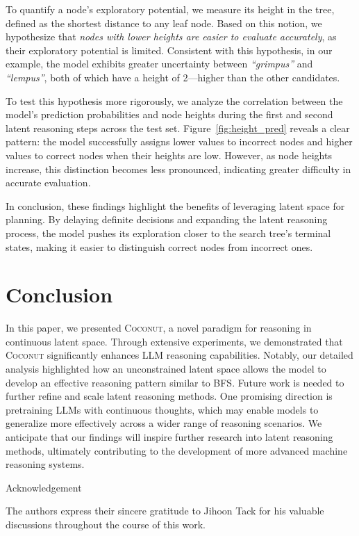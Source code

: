 \documentclass[]{fairmeta}
\newcommand{\ours}{\textsc{Coconut}\xspace}
\begin{document}
To quantify a node's exploratory potential, we measure its height in the tree, defined as the shortest distance to any leaf node. Based on this notion, we hypothesize that \textit{nodes with lower heights are easier to evaluate accurately}, as their exploratory potential is limited. Consistent with this hypothesis, in our example, the model exhibits greater uncertainty between \textit{``grimpus''} and \textit{``lempus''}, both of which have a height of 2—higher than the other candidates.


To test this hypothesis more rigorously, we analyze the correlation between the model’s prediction probabilities and node heights during the first and second latent reasoning steps across the test set. Figure~\ref{fig:height_pred} reveals a clear pattern: the model successfully assigns lower values to incorrect nodes and higher values to correct nodes when their heights are low. However, as node heights increase, this distinction becomes less pronounced, indicating greater difficulty in accurate evaluation.

In conclusion, these findings highlight the benefits of leveraging latent space for planning. By delaying definite decisions and expanding the latent reasoning process, the model pushes its exploration closer to the search tree’s terminal states, making it easier to distinguish correct nodes from incorrect ones.

\section{Conclusion}

In this paper, we presented \ours, a novel paradigm for reasoning in continuous latent space. Through extensive experiments, we demonstrated that \ours significantly enhances LLM reasoning capabilities. Notably, our detailed analysis highlighted how an unconstrained latent space allows the model to develop an effective reasoning pattern similar to BFS. Future work is needed to further refine and scale latent reasoning methods. One promising direction is pretraining LLMs with continuous thoughts, which may enable models to generalize more effectively across a wider range of reasoning scenarios. We anticipate that our findings will inspire further research into latent reasoning methods, ultimately contributing to the development of more advanced machine reasoning systems.


\newpage
{\Large \sffamily Acknowledgement\par}
The authors express their sincere gratitude to Jihoon Tack for his valuable discussions throughout the course of this work.
\end{document}

